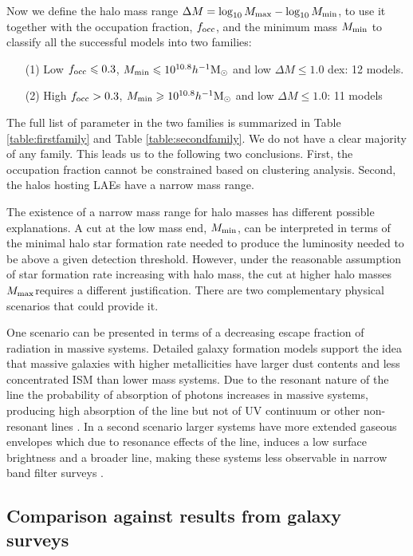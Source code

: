 \documentclass[usenatbib]{mn2e}
\newcommand{\ly}{{\ifmmode{{\rm Ly}\alpha}\else{Ly$\alpha$~}\fi}}
\newcommand{\hMsun}{{\ifmmode{h^{-1}{\rm
        {M_{\odot}}}}\else{$h^{-1}{\rm{M_{\odot}}}$}\fi}}
\begin{document}
Now we define the halo mass range $\Delta M=\log_{10}M_{\rm max} -
\log_{10}M_{\rm  min}$, to use it together with the occupation
fraction, $f_{\rm occ}$, and the minimum mass $M_{\rm min}$ to
classify all the successful models into two families:   


\begin{itemize}
\item[(1)] Low $f_{\rm occ}\leq 0.3$, $M_{\rm min}\leq 10^{10.8}\hMsun$ and low $\Delta M\leq 1.0$
  dex: 12 models. 
\item[(2)] High $f_{\rm occ}> 0.3$, $M_{\rm min}\geq 10^{10.8}\hMsun$ and
  low $\Delta M\leq 1.0$: 11 models 
\end{itemize}
%
The full list of parameter in the two families is summarized in Table
\ref{table:firstfamily} and Table \ref{table:secondfamily}. We do not
have a clear majority of any family. This leads us to the following
two conclusions. First, the occupation fraction cannot be constrained
based on clustering analysis. Second, the halos hosting LAEs have a
narrow mass range.  

The existence of a narrow mass range for halo masses has different
possible explanations. A cut at the low mass end, $M_{\rm min}$, can be
interpreted in terms of the minimal halo star formation rate needed to
produce the \ly luminosity needed to be above a given detection
threshold.  However, under the reasonable assumption of star formation
rate increasing with halo mass, the cut at higher halo masses $M_{\rm
  max}$requires a different justification. There are two complementary physical
scenarios that could provide it.

One scenario can be presented in terms of a decreasing escape fraction
of \ly radiation in massive systems. Detailed galaxy formation models
support the idea that massive galaxies with higher metallicities have
larger dust contents and less concentrated ISM than lower mass
systems. Due to the resonant nature of the \ly line the probability of
absorption  of \ly photons increases in massive systems, producing
high absorption of the \ly line but not of UV continuum or other
non-resonant lines \citep{Laursen2009,ForeroRomero2011}. In a second
scenario larger systems have more extended gaseous envelopes which due
to resonance effects of the \ly line, induces a low surface brightness
and a broader line, making these systems less observable in narrow
band filter surveys \citep{Laursen2009,Zheng2010}.    


\subsection{Comparison against results from galaxy surveys}
\end{document}
